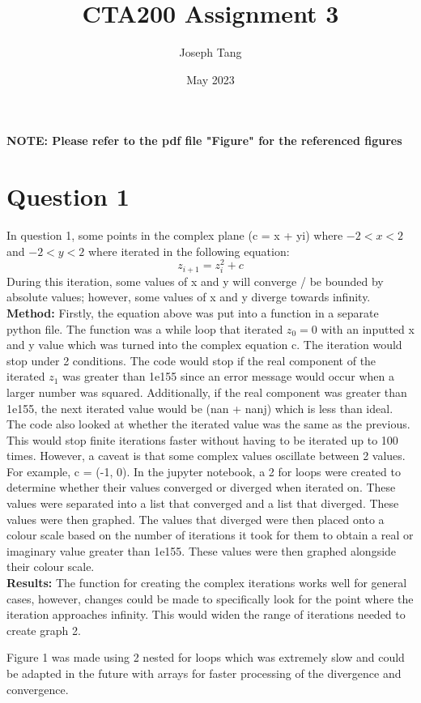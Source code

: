 \documentclass{article}
\title{CTA200 Assignment 3}
\author{Joseph Tang}
\date{May 2023}
\begin{document}
\textbf{NOTE: Please refer to the pdf file "Figure" for the referenced figures}

\section{Question 1}
In question 1, some points in the complex plane (c = x + yi) where $-2 < x < 2$ and $-2 < y < 2$ where iterated in the following equation:
$$z_{i+1} = z_{i}^2 + c$$ 
During this iteration, some values of x and y will converge / be bounded by absolute values; however, some values of x and y diverge towards infinity. \\

\textbf{Method:}
Firstly, the equation above was put into a function in a separate python file. The function was a while loop that iterated $z_0 = 0$ with an inputted x and y value which was turned into the complex equation c. The iteration would stop under 2 conditions. The code would stop if the real component of the iterated $z_1$ was greater than 1e155 since an error message would occur when a larger number was squared. Additionally, if the real component was greater than 1e155, the next iterated value would be (nan + nanj) which is less than ideal. The code also looked at whether the iterated value was the same as the previous. This would stop finite iterations faster without having to be iterated up to 100 times. However, a caveat is that some complex values oscillate between 2 values. For example, c = (-1, 0). In the jupyter notebook, a 2 for loops were created to determine whether their values converged or diverged when iterated on. These values were separated into a list that converged and a list that diverged. These values were then graphed. The values that diverged were then placed onto a colour scale based on the number of iterations it took for them to obtain a real or imaginary value greater than 1e155. These values were then graphed alongside their colour scale.\\

\textbf{Results:}
The function for creating the complex iterations works well for general cases, however, changes could be made to specifically look for the point where the iteration approaches infinity. This would widen the range of iterations needed to create graph 2. 

Figure 1 was made using 2 nested for loops which was extremely slow and could be adapted in the future with arrays for faster processing of the divergence and convergence.
\end{document}
